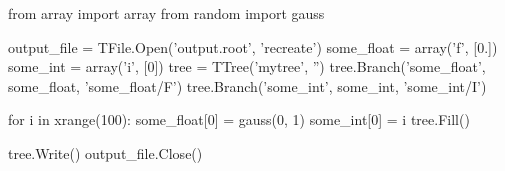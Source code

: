 \begin{footnotesize}
\begin{pyglist}[language=python,texcl=true,abovecaptionskip=0,style=vs,bgcolor=Moccasin]
from array import array
from random import gauss

output_file = TFile.Open('output.root', 'recreate')
some_float = array('f', [0.])
some_int = array('i', [0])
tree = TTree('mytree', '')
tree.Branch('some_float', some_float, 'some_float/F')
tree.Branch('some_int', some_int, 'some_int/I')

for i in xrange(100):
    some_float[0] = gauss(0, 1)
    some_int[0] = i
    tree.Fill()

tree.Write()
output_file.Close()
\end{pyglist}
\end{footnotesize}
